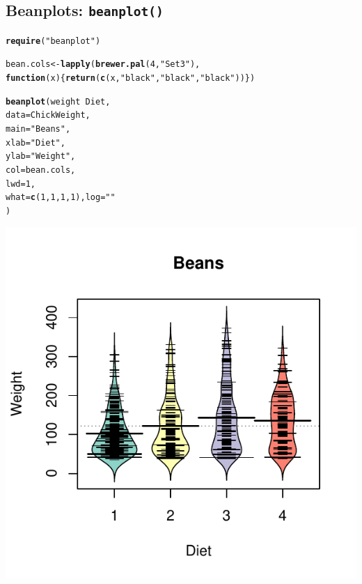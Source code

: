 \documentclass{tufte-book}\usepackage[]{graphicx}\usepackage[]{color}
\makeatletter
\def\maxwidth{ %
  \ifdim\Gin@nat@width>\linewidth
    \linewidth
  \else
    \Gin@nat@width
  \fi
}
\newcommand{\hlnum}[1]{\textcolor[rgb]{0.686,0.059,0.569}{#1}}%
\newcommand{\hlstr}[1]{\textcolor[rgb]{0.192,0.494,0.8}{#1}}%
\newcommand{\hlopt}[1]{\textcolor[rgb]{0,0,0}{#1}}%
\newcommand{\hlstd}[1]{\textcolor[rgb]{0.345,0.345,0.345}{#1}}%
\newcommand{\hlkwa}[1]{\textcolor[rgb]{0.161,0.373,0.58}{\textbf{#1}}}%
\newcommand{\hlkwb}[1]{\textcolor[rgb]{0.69,0.353,0.396}{#1}}%
\newcommand{\hlkwc}[1]{\textcolor[rgb]{0.333,0.667,0.333}{#1}}%
\newcommand{\hlkwd}[1]{\textcolor[rgb]{0.737,0.353,0.396}{\textbf{#1}}}%
\newenvironment{kframe}{%
 \def\at@end@of@kframe{}%
 \ifinner\ifhmode%
  \def\at@end@of@kframe{\end{minipage}}%
  \begin{minipage}{\columnwidth}%
 \fi\fi%
 \def\FrameCommand##1{\hskip\@totalleftmargin \hskip-\fboxsep
 \colorbox{shadecolor}{##1}\hskip-\fboxsep
     \hskip-\linewidth \hskip-\@totalleftmargin \hskip\columnwidth}%
 \MakeFramed {\advance\hsize-\width
   \@totalleftmargin\z@ \linewidth\hsize
   \@setminipage}}%
 {\par\unskip\endMakeFramed%
 \at@end@of@kframe}
\newenvironment{knitrout}{}{} %
\makeatother
\begin{document}
\begin{footnotesize}
\subsection{Beanplots: \texttt{beanplot()}}

\begin{marginfigure}
\begin{tiny}
\begin{knitrout}
\color{fgcolor}\begin{kframe}
\begin{alltt}
\hlkwd{require}\hlstd{(}\hlstr{"beanplot"}\hlstd{)}

\hlstd{bean.cols} \hlkwb{<-} \hlkwd{lapply}\hlstd{(}\hlkwd{brewer.pal}\hlstd{(}\hlnum{4}\hlstd{,} \hlstr{"Set3"}\hlstd{),}
                    \hlkwa{function}\hlstd{(}\hlkwc{x}\hlstd{) \{}\hlkwd{return}\hlstd{(}\hlkwd{c}\hlstd{(x,} \hlstr{"black"}\hlstd{,} \hlstr{"black"}\hlstd{,} \hlstr{"black"}\hlstd{))\})}

\hlkwd{beanplot}\hlstd{(weight} \hlopt{~} \hlstd{Diet,}
         \hlkwc{data} \hlstd{= ChickWeight,}
         \hlkwc{main} \hlstd{=} \hlstr{"Beans"}\hlstd{,}
         \hlkwc{xlab} \hlstd{=} \hlstr{"Diet"}\hlstd{,}
         \hlkwc{ylab} \hlstd{=} \hlstr{"Weight"}\hlstd{,}
         \hlkwc{col} \hlstd{= bean.cols ,}
         \hlkwc{lwd} \hlstd{=} \hlnum{1}\hlstd{,}
         \hlkwc{what} \hlstd{=} \hlkwd{c}\hlstd{(}\hlnum{1}\hlstd{,} \hlnum{1}\hlstd{,} \hlnum{1}\hlstd{,} \hlnum{1}\hlstd{),} \hlkwc{log} \hlstd{=} \hlstr{""}
         \hlstd{)}
\end{alltt}
\end{kframe}
\includegraphics[width=\maxwidth]{figure/unnamed-chunk-143-1} 


\end{knitrout}
\end{tiny}
\end{marginfigure}
\end{footnotesize}
\end{document}
